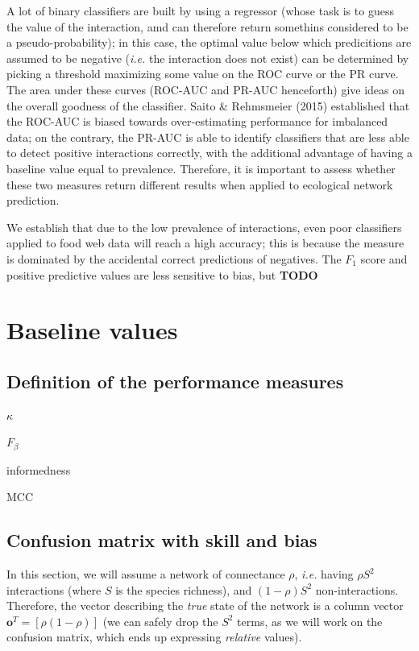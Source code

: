 \documentclass[11pt]{article}
\begin{document}
A lot of binary classifiers are built by using a regressor (whose task
is to guess the value of the interaction, amd can therefore return
somethins considered to be a pseudo-probability); in this case, the
optimal value below which predicitions are assumed to be negative
(\emph{i.e.} the interaction does not exist) can be determined by
picking a threshold maximizing some value on the ROC curve or the PR
curve. The area under these curves (ROC-AUC and PR-AUC henceforth) give
ideas on the overall goodness of the classifier. Saito \& Rehmsmeier
(2015) established that the ROC-AUC is biased towards over-estimating
performance for imbalanced data; on the contrary, the PR-AUC is able to
identify classifiers that are less able to detect positive interactions
correctly, with the additional advantage of having a baseline value
equal to prevalence. Therefore, it is important to assess whether these
two measures return different results when applied to ecological network
prediction.

We establish that due to the low prevalence of interactions, even poor
classifiers applied to food web data will reach a high accuracy; this is
because the measure is dominated by the accidental correct predictions
of negatives. The \(F_1\) score and positive predictive values are less
sensitive to bias, but \textbf{TODO}

\hypertarget{baseline-values}{%
\section{Baseline values}\label{baseline-values}}

\hypertarget{definition-of-the-performance-measures}{%
\subsection{Definition of the performance
measures}\label{definition-of-the-performance-measures}}

\(\kappa\)

\(F_{\beta}\)

informedness

MCC

\hypertarget{confusion-matrix-with-skill-and-bias}{%
\subsection{Confusion matrix with skill and
bias}\label{confusion-matrix-with-skill-and-bias}}

In this section, we will assume a network of connectance \(\rho\),
\emph{i.e.} having \(\rho S^2\) interactions (where \(S\) is the species
richness), and \((1-\rho) S^2\) non-interactions. Therefore, the vector
describing the \emph{true} state of the network is a column vector
\(\mathbf{o}^T = [\rho (1-\rho)]\) (we can safely drop the \(S^2\)
terms, as we will work on the confusion matrix, which ends up expressing
\emph{relative} values).
\end{document}
